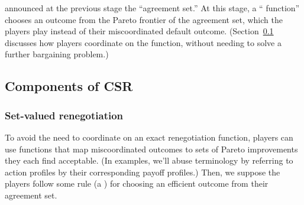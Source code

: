 \documentclass[sigconf]{aamas}
\theoremstyle{definition}
\begin{document}
\begin{enumerate}
    announced at the previous stage the “agreement set.''
    At this stage, a ``\selfunction{} function''
    chooses an outcome from the Pareto frontier
    of the agreement set,
    which the players play instead of their
    miscoordinated default outcome.
    (Section~\ref{sec:sub:components}
    discusses how players coordinate on the \selfunction{} function, without needing to solve a further bargaining
    problem.)
\end{enumerate}


\subsection{Components of
CSR}
\label{sec:sub:components}

\subsubsection{Set-valued renegotiation}

To avoid the need
to coordinate on an exact renegotiation function,
players
can
use functions
that map miscoordinated outcomes
to sets of Pareto improvements
they each find acceptable.
(In examples, we'll abuse terminology by referring to action profiles
by their corresponding payoff profiles.)
Then, we suppose
the players follow some rule
(a )
for choosing an efficient outcome from
their agreement set.
\end{document}
